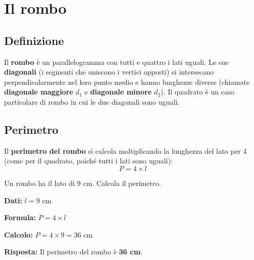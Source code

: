 \section{Il rombo}

\subsection{Definizione}

\begin{definizione}
    Il \textbf{rombo} è un parallelogramma con tutti e quattro i lati uguali. Le sue \textbf{diagonali} (i segmenti che uniscono i vertici opposti) si intersecano perpendicolarmente nel loro punto medio e hanno lunghezze diverse (chiamate \textbf{diagonale maggiore} $d_1$ e \textbf{diagonale minore} $d_2$). Il quadrato è un caso particolare di rombo in cui le due diagonali sono uguali.
\end{definizione}

\begin{center}
\end{center}

\subsection{Perimetro}

\begin{regola}
    Il \textbf{perimetro del rombo} si calcola moltiplicando la lunghezza del lato per 4 (come per il quadrato, poiché tutti i lati sono uguali):
    \[
        P = 4 \times l
    \]
\end{regola}

\begin{esempio}
    Un rombo ha il lato di 9 cm. Calcola il perimetro.

    \medskip
    \textbf{Dati:} $l = 9$ cm

    \textbf{Formula:} $P = 4 \times l$

    \textbf{Calcolo:} $P = 4 \times 9 = 36$ cm

    \textbf{Risposta:} Il perimetro del rombo è \textbf{36 cm}.
\end{esempio}

